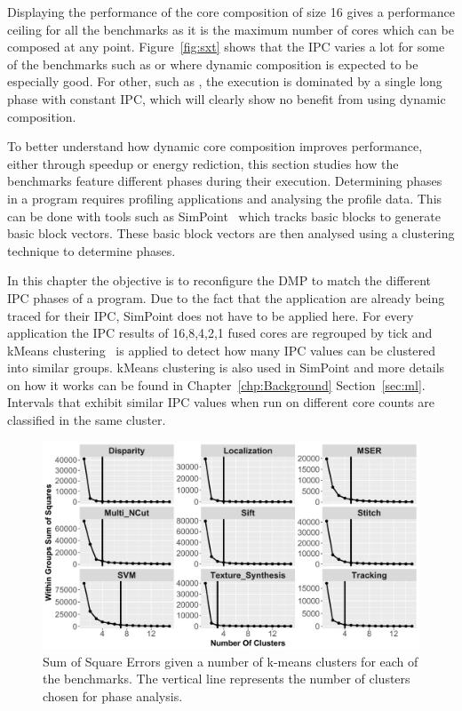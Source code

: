 Displaying the performance of the core composition of size 16 gives a performance ceiling for all the benchmarks as it is the maximum number of cores which can be composed at any point.
Figure~\ref{fig:sxt} shows that the IPC varies a lot for some of the benchmarks such as  or  where dynamic composition is expected to be especially good.
For other, such as , the execution is dominated by a single long phase with constant IPC, which will clearly show no benefit from using dynamic composition.

To better understand how dynamic core composition improves performance, either through speedup or energy rediction, this section studies how the benchmarks feature different phases during their execution.
Determining phases in a program requires profiling applications and analysing the profile data.
This can be done with tools such as SimPoint~\cite{simpoint} which tracks basic blocks to generate basic block vectors.
These basic block vectors are then analysed using a clustering technique to determine phases.

In this chapter the objective is to reconfigure the DMP to match the different IPC phases of a program.
Due to the fact that the application are already being traced for their IPC, SimPoint does not have to be applied here.
For every application the IPC results of 16,8,4,2,1 fused cores are regrouped by tick and kMeans clustering~\cite{kanungoKMeans02} is applied to detect how many IPC values can be clustered into similar groups.
kMeans clustering is also used in SimPoint and more details on how it works can be found in Chapter~\ref{chp:Background} Section~\ref{sec:ml}.
Intervals that exhibit similar IPC values when run on different core counts are classified in the same cluster.

\begin{figure}[t]
    \centering
    \includegraphics[width=1\textwidth]{cases-paper/graphics/Exploration/SSE_final.pdf}
    \caption{Sum of Square Errors given a number of k-means clusters for each of the benchmarks. The vertical line represents the number of clusters chosen for phase analysis.}
    \label{fig:sse}
		\vspace{1em}
\end{figure}

